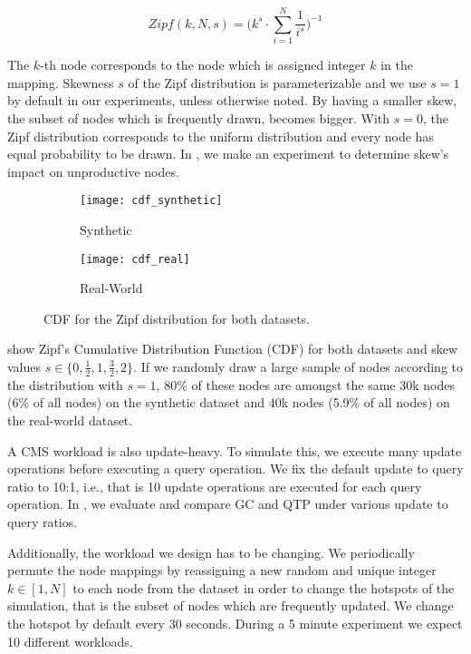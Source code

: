 \documentclass[abstracton,12pt]{scrartcl}
\theoremstyle{definition}
\begin{document}
\begin{large}

    $$ Zipf(k,N,s) = \bigg(k^s \cdot \sum_{i=1}^{N}\frac{1}{i^s} \bigg)^{-1} $$

\end{large}

The $k$-th node corresponds to the node which is assigned integer $k$ in the mapping.
Skewness $s$ of the Zipf distribution is parameterizable and we use $s=1$ by
default in our experiments, unless otherwise noted. By having a smaller skew,
the subset of nodes which is frequently drawn, becomes bigger.
With $s=0$, the Zipf distribution corresponds to the uniform distribution
and every node has equal probability to be drawn.
In , we make an experiment to determine skew's impact on
unproductive nodes.

\begin{figure}[h]
  \centering
   \begin{subfigure}{0.49\linewidth}
    \centering
    \caption{Synthetic}
    \texttt{[image: cdf\_synthetic]}
    \label{fig:cdf_synthetic}
  \end{subfigure}
  \begin{subfigure}{0.49\linewidth}
    \centering
    \caption{Real-World}
    \texttt{[image: cdf\_real]}
    \label{fig:cdf_real}
  \end{subfigure}
  \vspace{-0.5cm}
  \caption{CDF for the Zipf distribution for both datasets.}
\end{figure}

 show Zipf's Cumulative Distribution
Function (CDF) for both datasets and skew values $s \in \{0, \frac{1}{2}, 1, \frac{3}{2}, 2\}$.
If we randomly draw a large sample of nodes according to the distribution with $s=1$,
80\% of these nodes are amongst the same 30k nodes (6\% of all nodes) on the synthetic
dataset and 40k nodes (5.9\% of all nodes) on the real-world dataset.

A CMS workload is also update-heavy. To simulate this, we execute many update 
operations before
executing a query operation. We fix the default update to query ratio to 10:1, i.e., 
that is 10 update operations are executed for each query operation. In
, we evaluate and compare GC and QTP under various
update to query ratios.

Additionally, the workload we design has to be changing. We periodically permute 
the node mappings by reassigning a new random and unique integer $k \in [1,N]$ to each
node from the dataset in order to change the hotspots of the simulation, that is
the subset of nodes which are frequently updated.
We change the hotspot by default every 30 seconds. During a 5 minute
experiment we expect 10 different workloads.
\end{document}
